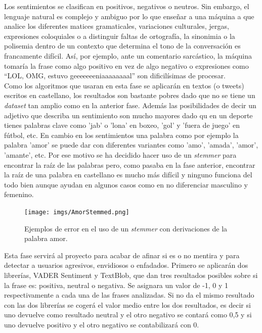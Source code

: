 \documentclass[../all.tex]{subfiles}
\begin{document}
    Los sentimientos se clasifican en positivos, negativos o neutros. Sin embargo, el lenguaje natural es complejo y ambiguo por lo que enseñar a una máquina a que analice los diferentes matices gramaticales, variaciones culturales, jergas, expresiones coloquiales o a distinguir faltas de ortografía, la sinonimia o la polisemia dentro de un contexto que determina el tono de la conversación es francamente difícil. Así, por ejemplo, ante un comentario sarcástico, la máquina tomaría la frase como algo positivo en vez de algo negativo o expresiones como “LOL, OMG, estuvo geeeeeeeniaaaaaaaal” son dificilísimas de procesar.\\
    
  Como los algoritmos que usaran en esta fase se aplicarán en textos (o tweets) escritos en castellano, los resultados son bastante pobres dado que no se tiene un \textit{dataset} tan amplio como en la anterior fase. Además las posibilidades de decir un adjetivo que describa un sentimiento son mucho mayores dado qu en un deporte tienes palabras clave como 'jab' o 'lona' en boxeo, 'gol' y 'fuera de juego' en fútbol, etc. En cambio en los sentimientos una palabra como por ejemplo la palabra 'amor' se puede dar con diferentes variantes como 'amo', 'amada', 'amor', 'amante', etc. Por ese motivo se ha decidido hacer uso de un \textit{stemmer} para encontrar la raíz de las palabras pero, como pasaba en la fase anterior, encontrar la raíz de una palabra en castellano es mucho más difícil y ninguno funciona del todo bien aunque ayudan en algunos casos como en no diferenciar masculino y femenino.\\
    
    \begin{figure}[H]
    	\centering
    	\texttt{[image: imgs/AmorStemmed.png]}
    	\caption{Ejemplos de error en el uso de un \textit{stemmer} con derivaciones de la palabra amor.}
    \end{figure}
    
    \newpage
    Esta fase servirá al proyecto para acabar de afinar si es o no mentira y para detectar a usuarios agresivos, envidiosos o enfadados. Primero se aplicarán dos librerías, VADER Sentiment y TextBlob, que dan tres resultados posibles sobre si la frase es: positiva, neutral o negativa. Se asignara un valor de -1, 0 y 1 respectivamente a cada una de las frases analizadas. Si no da el mismo resultado con las dos librerías se cogerá el valor medio entre los dos resultados, es decir si uno devuelve como resultado neutral y el otro negativo se contará como 0,5 y si uno devuelve positivo y el otro negativo se contabilizará con 0.\\
    
\end{document}
